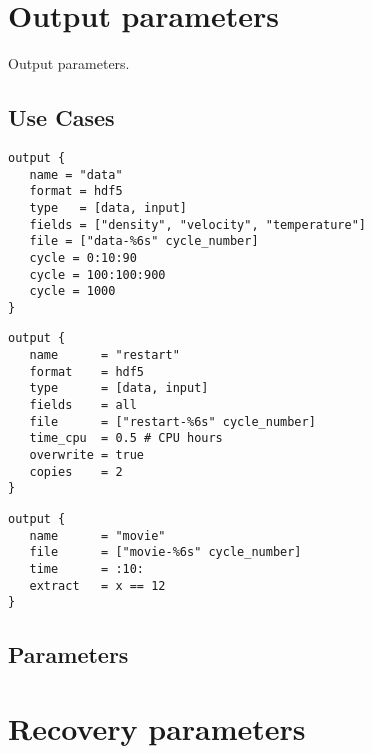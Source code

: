 \documentclass{book}
\begin{document}
\section{Output parameters} \label{s:output}

Output parameters.

\subsection{Use Cases}

\begin{verbatim}
output { 
   name = "data"
   format = hdf5
   type   = [data, input]
   fields = ["density", "velocity", "temperature"]
   file = ["data-%6s" cycle_number]
   cycle = 0:10:90
   cycle = 100:100:900
   cycle = 1000
}
\end{verbatim}

\begin{verbatim}
output { 
   name      = "restart"
   format    = hdf5
   type      = [data, input]
   fields    = all
   file      = ["restart-%6s" cycle_number]
   time_cpu  = 0.5 # CPU hours
   overwrite = true
   copies    = 2
}
\end{verbatim}

\begin{verbatim}
output { 
   name      = "movie"
   file      = ["movie-%6s" cycle_number]
   time      = :10:
   extract   = x == 12
}
\end{verbatim}


\subsection{Parameters}

\section{Recovery parameters} \label{s:recovery}
\end{document}
